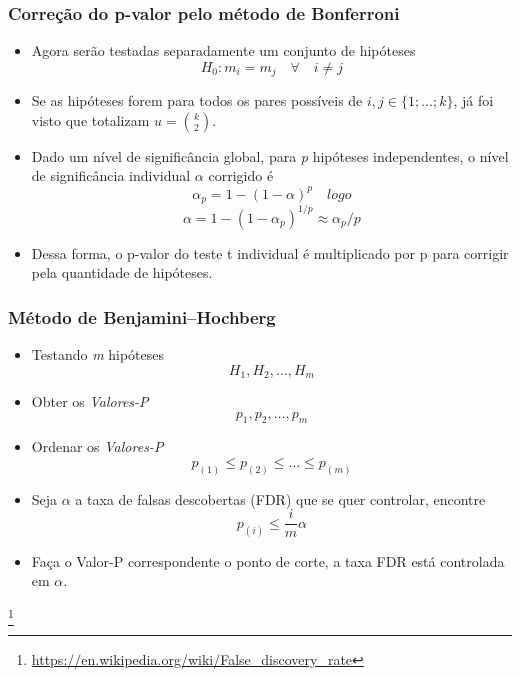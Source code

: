 \documentclass{beamer}
\newcommand\blfootnote[1]{%
  \begingroup
  \renewcommand\thefootnote{}\footnote{#1}%
  \addtocounter{footnote}{-1}%
  \endgroup
}
\begin{document}
\begin{frame}
\frametitle{Correção do p-valor pelo método de Bonferroni}

\begin{itemize}
\item Agora serão testadas separadamente um conjunto de hipóteses
\[H_0: m_i = m_j \quad \forall \quad i \neq j\]
\item Se as hipóteses forem para todos os pares possíveis de \(i, j \in \{1; \ldots; k\}\), já foi visto que totalizam \(u = \binom{k}{2}\).
\item Dado um nível de significância global, para \textit{p} hipóteses independentes, o nível de significância individual \(\alpha\) corrigido é
\[\alpha_p=1-(1-\alpha)^p\quad logo\]
\[\alpha = 1-(1-\alpha_p)^{1/p} \approx \alpha_p/p\]
\item Dessa forma, o p-valor do teste t individual é multiplicado por p para corrigir pela quantidade de hipóteses. 
\end{itemize}

\end{frame}

\begin{frame}
\frametitle{Método de Benjamini–Hochberg}

\begin{itemize}
\item Testando \textit{m} hipóteses
\[H_1, H_2, \ldots, H_m\]
\item Obter os \textit{Valores-P}
\[p_1, p_2, \ldots, p_m\]
\item Ordenar os \textit{Valores-P}
\[p_{(1)} \leq p_{(2)} \leq \ldots \leq p_{(m)}\]
\item Seja \(\alpha\) a taxa de falsas descobertas (FDR) que se quer controlar, encontre
\[p_{(i)} \leq \frac{i}{m}\alpha\]
\item Faça o Valor-P correspondente o ponto de corte, a taxa FDR está controlada em \(\alpha\). 
\end{itemize}
\blfootnote{\url{https://en.wikipedia.org/wiki/False_discovery_rate}}
\end{frame}
\end{document}
